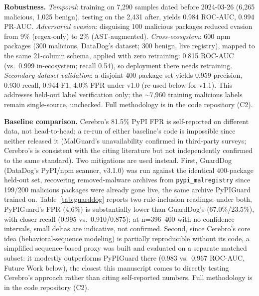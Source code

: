 \documentclass[preprint,12pt, a4paper]{elsarticle}
\begin{document}
\begin{enumerate}
\textbf{Robustness.} \textit{Temporal}: training on 7,290 samples dated before 2024-03-26 (6,265 malicious, 1,025 benign), testing on the 2,431 after, yields 0.984 ROC-AUC, 0.994 PR-AUC. \textit{Adversarial evasion}: disguising 100 malicious packages reduced evasion from 9\% (regex-only) to 2\% (AST-augmented). \textit{Cross-ecosystem}: 600 npm packages (300 malicious, DataDog's dataset; 300 benign, live registry), mapped to the same 21-column schema, applied with zero retraining: 0.815 ROC-AUC (vs.\ 0.999 in-ecosystem; recall 0.54), so deployment there needs retraining. \textit{Secondary-dataset validation}: a disjoint 400-package set yields 0.959 precision, 0.930 recall, 0.944 F1, 4.0\% FPR under v1.0 (re-used below for v1.1). This addresses held-out label verification only; the $\sim$7,960 training malicious labels remain single-source, unchecked. Full methodology is in the code repository (C2).

\textbf{Baseline comparison.} Cerebro's \cite{cerebro} 81.5\% PyPI FPR is self-reported on different data, not head-to-head; a re-run of either baseline's code is impossible since neither released it (MalGuard's \cite{malguard} unavailability confirmed in third-party surveys; Cerebro's is consistent with the citing literature but not independently confirmed to the same standard). Two mitigations are used instead. First, GuardDog \cite{guarddog} (DataDog's PyPI/npm scanner, v3.1.0) was run against the identical 400-package held-out set, recovering removed-malware archives from \texttt{pypi\_malregistry} \cite{malregistry} since 199/200 malicious packages were already gone live, the same archive PyPIGuard trained on. Table~\ref{tab:guarddog} reports two rule-inclusion readings; under both, PyPIGuard's FPR (4.6\%) is substantially lower than GuardDog's (67.0\%/23.5\%), with closer recall (0.995 vs.\ 0.910/0.875); at n=396--400 with no confidence intervals, small deltas are indicative, not confirmed. Second, since Cerebro's core idea (behavioral-sequence modeling) is partially reproducible without its code, a simplified sequence-based proxy was built and evaluated on a separate matched subset: it modestly outperforms PyPIGuard there (0.983 vs.\ 0.967 ROC-AUC, Future Work below), the closest this manuscript comes to directly testing Cerebro's approach rather than citing self-reported numbers. Full methodology is in the code repository (C2).


\end{enumerate}
\end{document}

